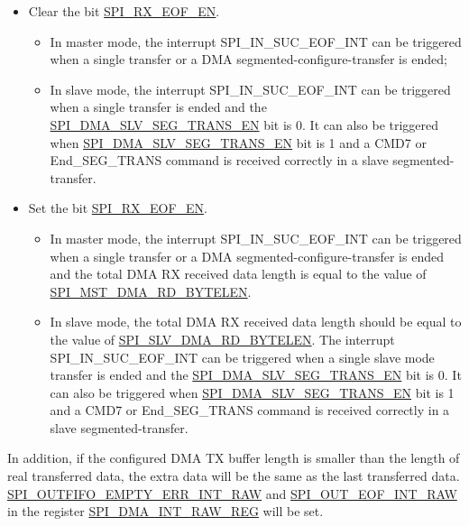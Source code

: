 \documentclass[main\_\_EN.tex]{subfiles}
\begin{document}
\begin{itemize}
    \item Clear the bit \hyperref[fielddesc:SPIRXEOFEN]{SPI\_RX\_EOF\_EN}.
        \begin{itemize}
            \item In master mode, the interrupt SPI\_IN\_SUC\_EOF\_INT can be triggered when a single transfer or a DMA segmented-configure-transfer is ended;

            \item In slave mode, the interrupt SPI\_IN\_SUC\_EOF\_INT can be triggered when a single transfer is ended and the \hyperref[fielddesc:SPIDMASLVSEGTRANSEN]{SPI\_DMA\_SLV\_SEG\_TRANS\_EN} bit is 0. It can also be triggered when \hyperref[fielddesc:SPIDMASLVSEGTRANSEN]{SPI\_DMA\_SLV\_SEG\_TRANS\_EN} bit is 1 and a CMD7 or End\_SEG\_TRANS command is received correctly in a slave segmented-transfer.
        \end{itemize}

    \item Set the bit \hyperref[fielddesc:SPIRXEOFEN]{SPI\_RX\_EOF\_EN}.
        \begin{itemize}
            \item In master mode, the interrupt SPI\_IN\_SUC\_EOF\_INT can be triggered when a single transfer or a DMA segmented-configure-transfer is ended and the total DMA RX received data length is equal to the value of \hyperref[fielddesc:SPIMSTDMARDBYTELEN]{SPI\_MST\_DMA\_RD\_BYTELEN}.

            \item In slave mode, the total DMA RX received data length should be equal to the value of \hyperref[fielddesc:SPISLVDMARDBYTELEN]{SPI\_SLV\_DMA\_RD\_BYTELEN}. The interrupt SPI\_IN\_SUC\_EOF\_INT can be triggered when a single slave mode transfer is ended and the \hyperref[fielddesc:SPIDMASLVSEGTRANSEN]{SPI\_DMA\_SLV\_SEG\_TRANS\_EN} bit is 0. It can also be triggered when \hyperref[fielddesc:SPIDMASLVSEGTRANSEN]{SPI\_DMA\_SLV\_SEG\_TRANS\_EN} bit is 1 and a CMD7 or End\_SEG\_TRANS command is received correctly in a slave segmented-transfer.
        \end{itemize}

\end{itemize}

In addition, if the configured DMA TX buffer length is smaller than the length of real transferred data, the extra data will be the same as the last transferred data. \hyperref[fielddesc:SPIOUTFIFOEMPTYERRINTRAW]{SPI\_OUTFIFO\_EMPTY\_ERR\_INT\_RAW} and \hyperref[fielddesc:SPIOUTEOFINTRAW]{SPI\_OUT\_EOF\_INT\_RAW} in the register \hyperref[regdesc:SPIDMAINTRAWREG]{SPI\_DMA\_INT\_RAW\_REG} will be set.
\end{document}
